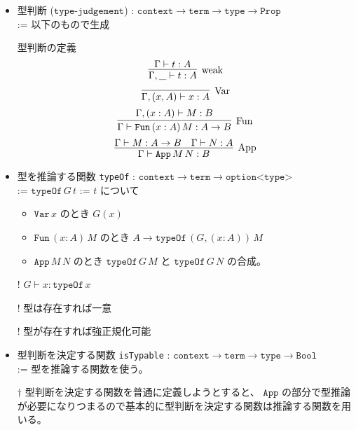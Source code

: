 \documentclass[dvipdfmx]{jsarticle}
\begin{document}
\begin{itemize}
  \item 型判断 (\(\texttt{type-judgement}\)) : \(\texttt{context} \to \texttt{term} \to \texttt{type} \to \texttt{Prop}\) \\
  := 以下のもので生成
  \begin{itembox}[l]{型判断の定義}
    \[\infer[\text{weak}]{\Gamma , \_ \vdash t : A}{\Gamma \vdash t : A}\]
    \[\infer[\text{Var}]{\Gamma , (x,A) \vdash x : A}{}\]
    \[\infer[\text{Fun}]{\Gamma \vdash \texttt{Fun} \, (x : A) \, M : A \to B}{\Gamma , (x:A) \vdash M : B}\]
    \[\infer[\text{App}]{\Gamma \vdash \texttt{App} \, M \, N : B}{\Gamma \vdash M : A \to B & \Gamma \vdash N : A}\]
  \end{itembox}
  
  \item 型を推論する関数 \texttt{typeOf} : \(\texttt{context} \to \texttt{term} \to \texttt{option<type>}\) \\
  := \(\texttt{typeOf} \, G \, t\) := \(t\) について
  \begin{itemize}
    \item \(\texttt{Var} \, x\) のとき \(G(x)\)
    \item \(\texttt{Fun} \, (x : A) \, M\) のとき \(A \to \texttt{typeOf} \, (G , (x : A)) \, M\)
    \item \(\texttt{App} \, M \, N\) のとき \(\texttt{typeOf} \, G \, M\) と \(\texttt{typeOf} \, G \, N\) の合成。
  \end{itemize}
  \item[!] \(G \vdash x : \texttt{typeOf} \, x\)
  \item[!] 型は存在すれば一意
  \item[!] 型が存在すれば強正規化可能 
  \item 型判断を決定する関数 \texttt{isTypable} : \(\texttt{context} \to \texttt{term} \to \texttt{type} \to \texttt{Bool}\) \\
  := 型を推論する関数を使う。
  \item[\(\dagger\)] 型判断を決定する関数を普通に定義しようとすると、 \(\texttt{App}\) の部分で型推論が必要になりつまるので基本的に型判断を決定する関数は推論する関数を用いる。
\end{itemize}
\end{document}
